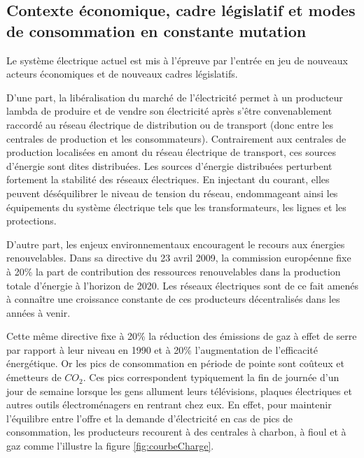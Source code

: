\subsection{Contexte économique, cadre législatif et modes de con\-sommation en 
constante mutation}

Le système électrique actuel est mis à l'épreuve par l'entrée en jeu de nouveaux 
acteurs économiques et de nouveaux cadres législatifs. 

D'une part, la libéralisation du marché de l'électricité permet à un producteur 
lambda de produire et de vendre son électricité après s'être convenablement 
raccordé au réseau électrique de distribution ou de transport (donc entre les 
centrales de production et les consommateurs). Contrairement aux centrales de 
production localisées en amont du réseau électrique de transport, ces sources 
d'énergie sont dites distribuées. Les sources d'énergie distribuées perturbent 
fortement la stabilité des réseaux électriques. En injectant du courant, elles 
peuvent déséquilibrer le niveau de tension du réseau, endommageant ainsi les 
équipements du système électrique tels que les transformateurs, les lignes et 
les protections. 

D'autre part, les enjeux environnementaux encouragent le recours aux énergies 
renouvelables. Dans sa directive du 23 avril 2009, la commission européenne fixe 
à 20\% la part de contribution des ressources renouvelables dans la production 
totale d'énergie à l'horizon de 2020. Les réseaux électriques sont de ce fait 
amenés à connaître une croissance constante de ces producteurs décentralisés 
dans les années à venir.

Cette même directive fixe à 20\% la réduction des émissions de gaz à effet de 
serre par rapport à leur niveau en 1990 et à 20\% l'augmentation de l'efficacité 
énergétique. Or les pics de consommation en période de pointe sont coûteux et 
émetteurs de $CO_{2}$. Ces pics correspondent typiquement la fin de journée d'un 
jour de semaine lorsque les gens allument leurs télévisions, plaques électriques 
et autres outils électroménagers en rentrant chez eux.  En effet, pour maintenir 
l'équilibre entre l'offre et la demande d'électricité en cas de pics de 
consommation, les producteurs recourent à des centrales à charbon, à fioul et à 
gaz comme l'illustre la figure \ref{fig:courbeCharge}.


